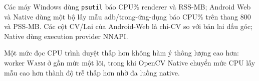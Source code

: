 \documentclass[conference]{IEEEtran}
\newcommand{\wasm}{\textnormal{\textsc{Wasm}}}
\begin{document}
\begin{table}[!htb]
\caption{Tóm tắt tài nguyên trên toàn lần chạy liên tục $N{=}185$. Ô CPU là
trung bình/đỉnh theo đơn vị gốc của công cụ; ô RAM là đỉnh CV/lai tính bằng MB.
Chỉ mang tính khả thi tham khảo; các đơn vị không so sánh được giữa các công cụ.}
\label{tab:resources}
\centering
\scriptsize
\setlength{\tabcolsep}{2.5pt}

\vspace{2pt}
\parbox{\columnwidth}{\footnotesize
Các máy Windows dùng \texttt{psutil} báo CPU\% renderer và RSS-MB; Android Web và
Native dùng một bộ lấy mẫu adb/trong-ứng-dụng báo CPU\% trên thang $800$ và PSS-MB.
Các cột CV/Lai của Android-Web là chỉ-CV so với bản lai dấu góc; Native dùng
execution provider NNAPI.}
\end{table}

Một mức đọc CPU trình duyệt thấp hơn không hàm ý thông lượng cao hơn: worker
\wasm{} ở gần mức một lõi, trong khi OpenCV Native chuyển mức CPU lấy mẫu cao hơn
thành độ trễ thấp hơn nhờ đa luồng native.
\end{document}
